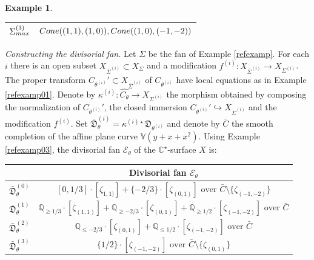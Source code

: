\documentclass[11pt, reqno]{amsart}
\theoremstyle{plain}
\theoremstyle{definition}
\newtheorem{example}[theorem]{Example}
\theoremstyle{remark}
\begin{document}
\begin{example}
\begin{center}
\begin{tabular}{|c| c |}
 \hline
  $\Sigma^{(3)}_{\rm max}$ &${\rm Cone}((1,1), (1,0)), {\rm Cone}((1,0), (-1,-2))$  \\ [2ex] 
 \hline
\end{tabular}
\end{center}
\emph{Constructing the divisorial fan.}
Let $\Sigma$ be the fan of Example \ref{refexamp}. For each $i$ there is an open subset 
$X_{\overline{\Sigma}^{(i)}}\subset X_{\Sigma}$ and a modification $f^{(i)}: X_{\overline{\Sigma}^{(i)}}\rightarrow X_{\Sigma^{(i)}}$.
The proper transform $C_{\theta^{(i)}}'\subset  X_{\overline{\Sigma}^{(i)}}$ of $C_{\theta^{(i)}}$ have
local equations as in Example \ref{refexamp01}. Denote by $\kappa^{(i)}:\widehat{C_{\theta}}\rightarrow X_{\Sigma^{(i)}}$ the morphism obtained by composing the normalization of $C_{\theta^{(i)}}'$, the closed immersion $C_{\theta^{(i)}}'\hookrightarrow X_{\overline{\Sigma}^{(i)}}$ and the modification $f^{(i)}$. Set $\bar{\mathfrak{D}}^{(i)}_{\theta} =  \kappa^{(i)\star}\mathfrak{D}_{\theta^{(i)}}$ and denote by $\bar{C}$ the smooth completion of the affine plane curve $\mathbb{V}(y+x + x^{2})$.
Using Example \ref{refexamp03},  the divisorial fan $\mathscr{E}_{\theta}$  of the $\mathbb{C}^{\star}$-surface $X$ is:
\begin{center}
 \begin{tabular}{|c| c |} 
 \hline
  &  Divisorial fan $\mathscr{E}_{\theta}$ \\ [1ex] 
 \hline\hline
 $\bar{\mathfrak{D}}^{(0)}_{\theta}$ & $[0, 1/3]\cdot [\zeta_{1,1)}] + \{-2/3\}\cdot [\zeta_{(0,1)}]\text{ over }\bar{C}\setminus\{\zeta_{(-1,-2)}\}$ \\ [2ex] 
 \hline
 $\bar{\mathfrak{D}}^{(1)}_{\theta}$ & $ \mathbb{Q}_{\geq 1/3}\cdot [\zeta_{(1,1)}] + \mathbb{Q}_{\geq -2/3}\cdot [\zeta_{(0,1)}]+\mathbb{Q}_{\geq 1/2}\cdot [\zeta_{(-1,-2)}] \text{ over }\bar{C}$ \\  [2ex] 
 \hline
 $\bar{\mathfrak{D}}^{(2)}_{\theta}$ & $ \mathbb{Q}_{\leq -2/3}\cdot [\zeta_{(0,1)}]+\mathbb{Q}_{\leq 1/2}\cdot [\zeta_{(-1,-2)}]\text{ over }\bar{C}$ \\ [2ex] 
 \hline
 $\bar{\mathfrak{D}}^{(3)}_{\theta}$ & $\{1/2\}\cdot [\zeta_{(-1,-2)}]\text{ over } \bar{C}\setminus\{\zeta_{(0,1)}\}$ \\ [2ex] 
 \hline
\end{tabular}
\end{center}
\end{example}
\end{document}
